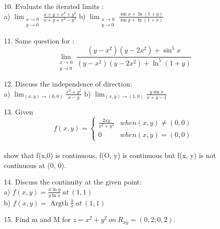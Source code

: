 \documentclass[11pt]{amsbook}
\begin{document}
\begin{enumerate}
    \item[10.] Evaluate the iterated limits : \\
    a) $ \lim_{\substack{x\to 0 \\ y\to 0}}  \frac{x+y+x^2+y^2}{x+y+x^2-y^2} $   \qquad
    b) $ \lim_{\substack{x\to 0 \\ y\to 0}}  \frac{\sin x + \ln \left ( 1+y \right)}{\sin y + \ln \left ( 1+x \right )} $
    \item[11.] Same question for : \\
    $$ \lim_{\substack{x\to 0 \\ y\to 0}} \frac{\left ( y - x^2 \right ) \left ( y - 2x^2 \right )+ \sin^5 x }
    {\left ( y - x^2 \right )\left ( y - 2x^2 \right )+ \ln^5 \left ( 1+y \right ) } $$
    \item[12.]Discuss the independence of direction:   \\
    a) $ \lim_{(x,y)\to (0,0)} \frac{x^2+y^2}{x-y} $ \qquad
    b) $ \lim_{(x,y)\to (1,0)} \frac{y \sin x}{x+y-1} $
    \item[13.]Given \\
    $$f(x,y)=
    \begin{cases}
    \frac{2xy}{x^2+y^2}  & when \left ( x,y   \right) \neq \left ( 0,0   \right) \\
    0 & when \left ( x,y   \right) = \left ( 0,0   \right) 
    \end{cases} $$  \\
    show that f(x,0) is  continuous, f(O, y) is continuous but f(x, y) is not continuous at (0, 0).
    \item[14.] Discuss the continuity at the given point: \\
    a) $ f(x,y) = \frac{x \ln y}{y \ln x}\  at \  \left(1,1\right) $ \\
    b) $ f(x,y) = \operatorname*{Argth} \frac {y}{x} \  at \  \left(1,1\right) $
    \item[15.] Find m and M for $ z = x^2+y^2 \ on \  R_{xy} = ( 0, 2 ; 0 , 2 ). $
\end{enumerate}
\end{document}
